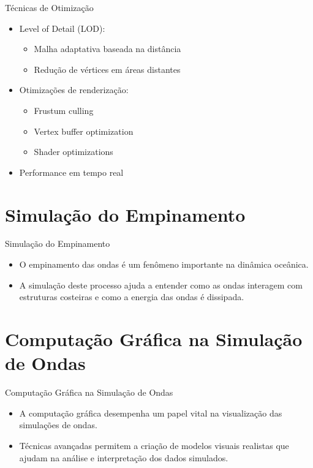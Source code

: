 \documentclass[aspectratio=169,xcolor=table]{beamer}
\begin{document}
\begin{frame}{Técnicas de Otimização}
    \begin{itemize}
        \item Level of Detail (LOD):
        \begin{itemize}
            \item Malha adaptativa baseada na distância
            \item Redução de vértices em áreas distantes
        \end{itemize}
        \item Otimizações de renderização:
        \begin{itemize}
            \item Frustum culling
            \item Vertex buffer optimization
            \item Shader optimizations
        \end{itemize}
        \item Performance em tempo real \cite{wavesimulator2024}
    \end{itemize}
\end{frame}

\section{Simulação do Empinamento}
\begin{frame}{Simulação do Empinamento}
    \begin{itemize}
        \item O empinamento das ondas é um fenômeno importante na dinâmica oceânica.
        \item A simulação deste processo ajuda a entender como as ondas interagem com estruturas costeiras e como a energia das ondas é dissipada.
    \end{itemize}
\end{frame}

\section{Computação Gráfica na Simulação de Ondas}
\begin{frame}{Computação Gráfica na Simulação de Ondas}
    \begin{itemize}
        \item A computação gráfica desempenha um papel vital na visualização das simulações de ondas.
        \item Técnicas avançadas permitem a criação de modelos visuais realistas que ajudam na análise e interpretação dos dados simulados.
    \end{itemize}
\end{frame}
\end{document}
